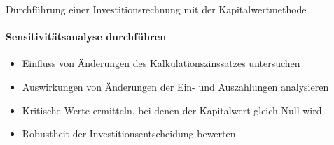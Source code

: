 \begin{KR}{Durchführung einer Investitionsrechnung mit der Kapitalwertmethode}
\paragraph{Sensitivitätsanalyse durchführen}
\begin{itemize}
    \item Einfluss von Änderungen des Kalkulationszinssatzes untersuchen
    \item Auswirkungen von Änderungen der Ein- und Auszahlungen analysieren
    \item Kritische Werte ermitteln, bei denen der Kapitalwert gleich Null wird
    \item Robustheit der Investitionsentscheidung bewerten
\end{itemize}
\end{KR}